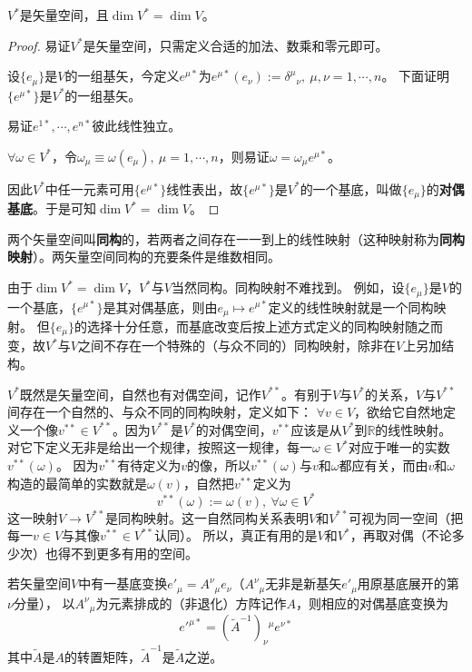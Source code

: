 \begin{theorem}
$V^*$是矢量空间，且$\dim V^* = \dim V$。
\end{theorem}

\begin{proof}
易证$V^*$是矢量空间，只需定义合适的加法、数乘和零元即可。

设$\{e_\mu\}$是$V$的一组基矢，今定义$e^{\mu*}$为$e^{\mu*}(e_\nu) := \delta^\mu{}_\nu, ~ \mu, \nu = 1, \cdots, n$。
下面证明$\{e^{\mu*}\}$是$V^*$的一组基矢。

易证$e^{1*}, \cdots, e^{n*}$彼此线性独立。

$\forall \omega \in V^*$，令$\omega_\mu \equiv \omega(e_\mu), ~ \mu = 1, \cdots, n$，则易证$\omega = \omega_\mu e^{\mu*}$。

因此$V^*$中任一元素可用$\{e^{\mu*}\}$线性表出，故$\{e^{\mu*}\}$是$V^*$的一个基底，叫做$\{e_\mu\}$的\textbf{对偶基底}。于是可知$\dim V^* = \dim V$。
\end{proof}

两个矢量空间叫\textbf{同构}的，若两者之间存在一一到上的线性映射（这种映射称为\textbf{同构映射}）。两矢量空间同构的充要条件是维数相同。

由于$\dim V^* = \dim V$，$V^*$与$V$当然同构。同构映射不难找到。
例如，设$\{e_\mu\}$是$V$的一个基底，$\{e^{\mu*}\}$是其对偶基底，则由$e_\mu \mapsto e^{\mu*}$定义的线性映射就是一个同构映射。
但$\{e_\mu\}$的选择十分任意，而基底改变后按上述方式定义的同构映射随之而变，故$V^*$与$V$之间不存在一个特殊的（与众不同的）同构映射，除非在$V$上另加结构。

$V^*$既然是矢量空间，自然也有对偶空间，记作$V^{**}$。有别于$V$与$V^*$的关系，$V$与$V^{**}$间存在一个自然的、与众不同的同构映射，定义如下：
$\forall v \in V$，欲给它自然地定义一个像$v^{**} \in V^{**}$。因为$V^{**}$是$V^*$的对偶空间，$v^{**}$应该是从$V^*$到$\mathbb{R}$的线性映射。
对它下定义无非是给出一个规律，按照这一规律，每一$\omega \in V^*$对应于唯一的实数$v^{**}(\omega)$。
因为$v^{**}$有待定义为$v$的像，所以$v^{**}(\omega)$与$v$和$\omega$都应有关，而由$v$和$\omega$构造的最简单的实数就是$\omega(v)$，自然把$v^{**}$定义为
$$v^{**}(\omega) := \omega(v), ~ \forall \omega \in V^*$$
这一映射$V \to V^{**}$是同构映射。这一自然同构关系表明$V$和$V^{**}$可视为同一空间（把每一$v \in V$与其像$v^{**} \in V^{**}$认同）。
所以，真正有用的是$V$和$V^*$，再取对偶（不论多少次）也得不到更多有用的空间。

\begin{theorem}
若矢量空间$V$中有一基底变换$e'_\mu = A^\nu{}_\mu e_\nu$（$A^\nu{}_\mu$无非是新基矢$e'_\mu$用原基底展开的第$\nu$分量），
以$A^\nu{}_\mu$为元素排成的（非退化）方阵记作$A$，则相应的对偶基底变换为
$$e'^{\mu*} = (\tilde{A}^{-1})_\nu{}^\mu e^{\nu*}$$
其中$\tilde{A}$是$A$的转置矩阵，$\tilde{A}^{-1}$是$\tilde{A}$之逆。
\end{theorem}

